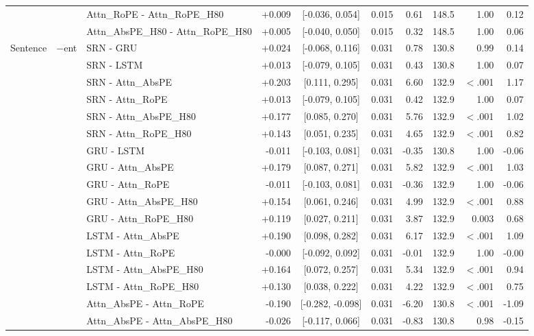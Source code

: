 \begin{longtable}{@{}lllrcrrrrr@{}}
 &  & Attn\_RoPE - Attn\_RoPE\_H80 & +0.009 & [-0.036, 0.054] & 0.015 & 0.61 & 148.5 & 1.00 & 0.12 \\
 &  & Attn\_AbsPE\_H80 - Attn\_RoPE\_H80 & +0.005 & [-0.040, 0.050] & 0.015 & 0.32 & 148.5 & 1.00 & 0.06 \\
\addlinespace[2pt]
\addlinespace
Sentence & $-$ent & SRN - GRU & +0.024 & [-0.068, 0.116] & 0.031 & 0.78 & 130.8 & 0.99 & 0.14 \\
 &  & SRN - LSTM & +0.013 & [-0.079, 0.105] & 0.031 & 0.43 & 130.8 & 1.00 & 0.07 \\
 &  & SRN - Attn\_AbsPE & +0.203 & [0.111, 0.295] & 0.031 & 6.60 & 132.9 & $<$.001 & 1.17 \\
 &  & SRN - Attn\_RoPE & +0.013 & [-0.079, 0.105] & 0.031 & 0.42 & 132.9 & 1.00 & 0.07 \\
 &  & SRN - Attn\_AbsPE\_H80 & +0.177 & [0.085, 0.270] & 0.031 & 5.76 & 132.9 & $<$.001 & 1.02 \\
 &  & SRN - Attn\_RoPE\_H80 & +0.143 & [0.051, 0.235] & 0.031 & 4.65 & 132.9 & $<$.001 & 0.82 \\
 &  & GRU - LSTM & -0.011 & [-0.103, 0.081] & 0.031 & -0.35 & 130.8 & 1.00 & -0.06 \\
 &  & GRU - Attn\_AbsPE & +0.179 & [0.087, 0.271] & 0.031 & 5.82 & 132.9 & $<$.001 & 1.03 \\
 &  & GRU - Attn\_RoPE & -0.011 & [-0.103, 0.081] & 0.031 & -0.36 & 132.9 & 1.00 & -0.06 \\
 &  & GRU - Attn\_AbsPE\_H80 & +0.154 & [0.061, 0.246] & 0.031 & 4.99 & 132.9 & $<$.001 & 0.88 \\
 &  & GRU - Attn\_RoPE\_H80 & +0.119 & [0.027, 0.211] & 0.031 & 3.87 & 132.9 & 0.003 & 0.68 \\
 &  & LSTM - Attn\_AbsPE & +0.190 & [0.098, 0.282] & 0.031 & 6.17 & 132.9 & $<$.001 & 1.09 \\
 &  & LSTM - Attn\_RoPE & -0.000 & [-0.092, 0.092] & 0.031 & -0.01 & 132.9 & 1.00 & -0.00 \\
 &  & LSTM - Attn\_AbsPE\_H80 & +0.164 & [0.072, 0.257] & 0.031 & 5.34 & 132.9 & $<$.001 & 0.94 \\
 &  & LSTM - Attn\_RoPE\_H80 & +0.130 & [0.038, 0.222] & 0.031 & 4.22 & 132.9 & $<$.001 & 0.75 \\
 &  & Attn\_AbsPE - Attn\_RoPE & -0.190 & [-0.282, -0.098] & 0.031 & -6.20 & 130.8 & $<$.001 & -1.09 \\
 &  & Attn\_AbsPE - Attn\_AbsPE\_H80 & -0.026 & [-0.117, 0.066] & 0.031 & -0.83 & 130.8 & 0.98 & -0.15 \\

\end{longtable}
